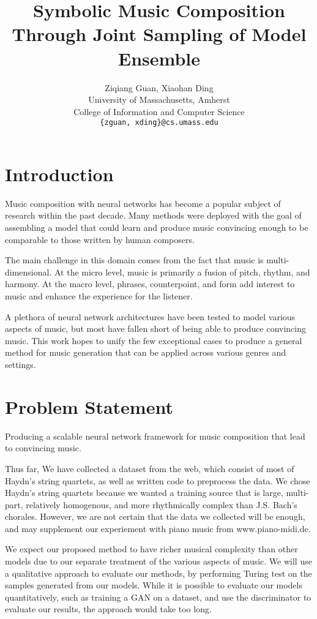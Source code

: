 \documentclass[10pt,twocolumn,letterpaper]{article}
\title{Symbolic Music Composition Through Joint Sampling of Model Ensemble}
\author{
  Ziqiang Guan, Xiaohan Ding\\
  University of Massachusetts, Amherst \\
  College of Information and Computer Science \\
  {\tt\small \{zguan, xding\}@cs.umass.edu}
}
\begin{document}
  \maketitle

  \section{Introduction}
  Music composition with neural networks has become a popular subject of research within the past decade. Many methods were deployed with the goal of assembling a model that could learn and produce music convincing enough to be comparable to those written by human composers.

  The main challenge in this domain comes from the fact that music is multi-dimensional. At the micro level, music is primarily a fusion of pitch, rhythm, and harmony. At the macro level, phrases, counterpoint, and form add interest to music and enhance the experience for the listener.

  A plethora of neural network architectures have been tested to model various aspects of music, but most have fallen short of being able to produce convincing music. This work hopes to unify the few exceptional cases to produce a general method for music generation that can be applied across various genres and settings.

  \section{Problem Statement}
  Producing a scalable neural network framework for music composition that lead to convincing music.

  \vspace{4mm}
  Thus far, We have collected a dataset from the web, which consist of most of Haydn's string quartets, as well as written code to preprocess the data. We chose Haydn's string quartets because we wanted a training source that is large, multi-part, relatively homogenous, and more rhythmically complex than J.S. Bach's chorales. However, we are not certain that the data we collected will be enough, and may supplement our experiement with piano music from www.piano-midi.de.

  We expect our proposed method to have richer musical complexity than other models due to our separate treatment of the various aspects of music. We will use a qualitative approach to evaluate our methods, by performing Turing test on the samples generated from our models. While it is possible to evaluate our models quantitatively, such as training a GAN on a dataset, and use the discriminator to evaluate our results, the approach would take too long.
\end{document}
